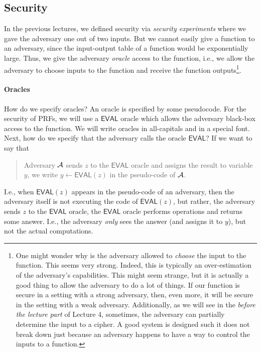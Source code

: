 \documentclass[a4paper,table,dvipsnames]{article}
\theoremstyle{definition}
\renewcommand{\O}[1]{\ensuremath{\mathsf{#1}}}
\begin{document}

\subsection{Security}
In the previous lectures, we defined security via \emph{security experiments} where we gave
the adversary one out of two inputs. But we cannot easily give a function to an adversary,
since the input-output table of a function would be exponentially large. Thus, we give the
adversary \emph{oracle} access to the function, i.e., we allow the adversary to choose inputs
to the function and receive the function outputs\footnote{One
might wonder why is the adversary allowed to \emph{choose} the input to the function. This seems
very strong. Indeed, this is typically an over-estimation of the adversary's capabilities.
This might seem strange, but it is actually a good thing to allow the adversary to do a lot of
things. If our function is secure in a setting with a strong adversary, then, even more, it will
be secure in the setting with a weak adversary. Additionally, as we will see in the \emph{before the lecture part}
of Lecture 4, sometimes, the adversary can partially determine the input to a cipher. A good
system is designed such it does not break down just because an adversary happens to have a
way to control the inputs to a function.}.

\paragraph{Oracles}
How do we specify oracles? An oracle is specified by some pseudocode. For the security of PRFs,
we will use a $\O{EVAL}$ oracle which allows the adversary black-box access to the function.
We will write oracles in all-capitals and in a special font. Next, how do we specify that the adversary calls the oracle $\O{EVAL}$? If we want to say that
\begin{quote}
Adversary $\mathcal{A}$ sends $z$ to the $\O{EVAL}$ oracle and assigns the result to variable $y$,
we write $y\gets\O{EVAL}(z)$ in the pseudo-code of $\mathcal{A}$.
\end{quote}
I.e., when $\O{EVAL}(z)$ appears in the
pseudo-code of an adversary, then the adversary itself is not executing the code of $\O{EVAL}(z)$,
but rather, the adversary sends $z$ to the $\O{EVAL}$ oracle, the $\O{EVAL}$ oracle performs operations 
and returns some answer. I.e., the adversary \emph{only} sees the answer (and assigns it to $y$), but
 not the actual computations.
\end{document}
